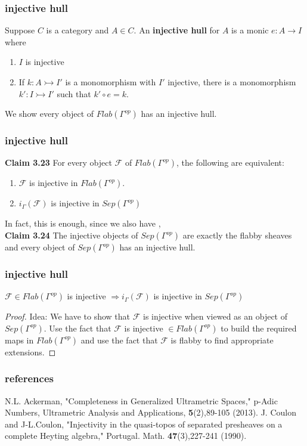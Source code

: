 \documentclass{beamer}
\begin{document}
\begin{frame}
\frametitle{injective hull}
\begin{definition}
Suppose $C$ is a category and $A \in C$. An \textbf{injective hull} for $A$ is a monic $e:A \rightarrow I$ where 
\begin{enumerate}
	\item $I$ is injective
	\item If $k: A \rightarrowtail I'$ is a monomorphism with $I'$ injective, there is a monomorphism $k':I \rightarrowtail I'$ such that $k' \circ e =k$.	
\end{enumerate}
\end{definition}
\[\]
We show every object of $Flab(\Gamma^{op})$ has an injective hull.
\end{frame}

\begin{frame}
\frametitle{injective hull}
\textbf{Claim 3.23} For every object $\mathcal{F}$ of $Flab(\Gamma^{op})$, the following are equivalent:
\begin{enumerate}
	\item $\mathcal{F}$ is injective in $Flab(\Gamma^{op})$.
	\item $i_\Gamma(\mathcal{F})$ is injective in $Sep(\Gamma^{op})$
\end{enumerate}
\[\]
In fact, this is enough, since we also have \cite{Coulon},\\

\textbf{Claim 3.24} The injective objects of $Sep(\Gamma^{op})$ are exactly the flabby sheaves and every object of $Sep(\Gamma^{op})$ has an injective hull.
\end{frame}	

\begin{frame}
\frametitle{injective hull}
$\mathcal{F} \in Flab(\Gamma^{op})$ is injective $\Rightarrow i_\Gamma(\mathcal{F})$ is injective in $Sep(\Gamma^{op})$ 
\begin{proof}
Idea: We have to show that $\mathcal{F}$ is injective when viewed as an object of $Sep(\Gamma^{op})$. Use the fact that $\mathcal{F}$ is injective $\in Flab(\Gamma^{op})$ to build the required maps in  $Flab(\Gamma^{op})$ and use the fact that $\mathcal{F}$ is flabby to find appropriate extensions. 


\end{proof}	
\end{frame}


\begin{frame}
\frametitle{references}
\begin{thebibliography}{1}
	 N.L. Ackerman, "Completeness in Generalized Ultrametric Spaces," p-Adic Numbers, Ultrametric Analysis and Applications, \textbf{5}(2),89-105 (2013).
 J. Coulon and J-L.Coulon, "Injectivity in the quasi-topos of separated presheaves on a complete Heyting algebra," Portugal. Math. \textbf{47}(3),227-241 (1990).
\end{thebibliography}
\end{frame}
\end{document}
